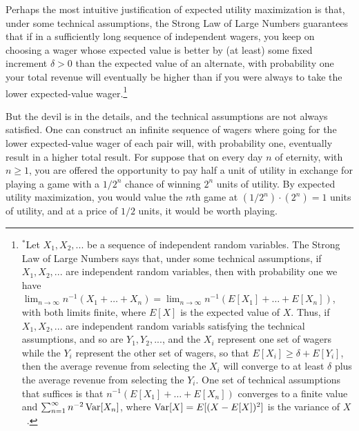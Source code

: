 Perhaps the most intuitive justification of expected utility maximization is that, under some technical assumptions,
the Strong Law of Large Numbers guarantees that if in a sufficiently long sequence of independent wagers, you keep 
on choosing a wager whose expected value is better by (at least) some fixed increment $\delta>0$ than the expected
value of an alternate, with probability one your total revenue will eventually be higher than if you were always to take the
lower expected-value wager.\footnote{$^*$Let $X_1,X_2,...$ be a sequence of independent random variables. The Strong 
Law of Large Numbers says that, under some technical assumptions, if $X_1,X_2,...$ are independent random variables, 
then with probability one we have $\lim_{n\to\infty} n^{-1} (X_1+\dots+X_n) = \lim_{n\to\infty} n^{-1} (E[X_1]+\dots+E[X_n])$, with both limits finite, where $E[X]$ is the expected value of $X$. Thus, if $X_1,X_2,...$ are independent random variabls satisfying the
technical assumptions, and so are $Y_1,Y_2,...$, and the $X_i$ represent one set of wagers while the $Y_i$ represent
the other set of wagers, so that $E[X_i] \ge \delta + E[Y_i]$, then the average revenue from selecting the $X_i$ will
converge to at least $\delta$ plus the average revenue from selecting the $Y_i$. One set of
technical assumptions that suffices is that $n^{-1}(E[X_1]+\dots+E[X_n])$ converges to a finite value and 
$\sum_{n=1}^\infty n^{-2} \operatorname{Var}[X_n]$, where $\operatorname{Var}[X]=E[(X-E[X])^2]$ is the variance of $X$~\parencite[p.~132]{ChungProbability}.}

But the devil is in the details, and the technical assumptions are not always satisfied. One can construct an infinite
sequence of wagers where going for the lower expected-value wager of each pair will, with probability one, eventually
result in a higher total result. For suppose that on every day $n$ of
eternity, with $n\ge 1$, you are offered the opportunity to pay half a unit of utility in exchange for playing a game with a 
$1/2^n$ chance of winning $2^n$ units of utility. By expected utility maximization, you would value the $n$th game at
$(1/2^n)\cdot (2^n)=1$ units of utility, and at a price of $1/2$ units, it would be worth playing. 

